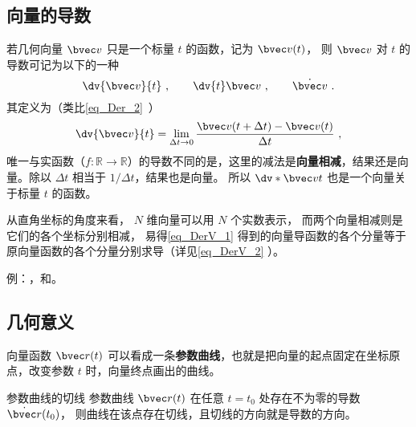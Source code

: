 
\begin{issues}
\end{issues}


\subsection{向量的导数}

若几何向量 $\bvec v$ 只是一个标量 $t$ 的函数，记为 $\bvec v(t)$， 则 $\bvec v$ 对 $t$ 的导数可记为以下的一种
\begin{equation}
\dv{\bvec v}{t}~, \qquad \dv{t}\bvec v~, \qquad \dot{\bvec v}~.
\end{equation}
其定义为（类比\autoref{eq_Der_2}~）
\begin{equation}\label{eq_DerV_1}
\dv{\bvec v}{t} = \lim_{\Delta t \to 0} \frac{\bvec v ( t + \Delta t) - \bvec v(t)}{\Delta t}~,
\end{equation}
唯一与实函数\enref（$f:\mathbb R \to \mathbb R$）的导数不同的是，这里的减法是\textbf{向量相减}，结果还是向量。除以 $\Delta t$ 相当于 $1/\Delta t$，结果也是向量。 所以 $\dv*{\bvec v}{t}$ 也是一个向量关于标量 $t$ 的函数。

从直角坐标的角度来看， $N$ 维向量可以用 $N$ 个实数表示， 而两个向量相减则是它们的各个坐标分别相减， 易得\autoref{eq_DerV_1} 得到的向量导函数的各个分量等于原向量函数的各个分量分别求导（详见\autoref{eq_DerV_2} ）。

例：，和。

\subsection{几何意义}
向量函数 $\bvec r(t)$ 可以看成一条\textbf{参数曲线}，也就是把向量的起点固定在坐标原点，改变参数 $t$ 时，向量终点画出的曲线。

\begin{theorem}{参数曲线的切线}
参数曲线 $\bvec r(t)$ 在任意 $t=t_0$ 处存在不为零的导数 $\dot{\bvec r}(t_0)$， 则曲线在该点存在切线，且切线的方向就是导数的方向。
\end{theorem}

